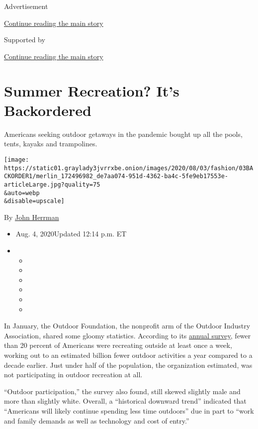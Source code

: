 Advertisement

\protect\hyperlink{after-top}{Continue reading the main story}

Supported by

\protect\hyperlink{after-sponsor}{Continue reading the main story}

\hypertarget{summer-recreation-its-backordered}{%
\section{Summer Recreation? It's
Backordered}\label{summer-recreation-its-backordered}}

Americans seeking outdoor getaways in the pandemic bought up all the
pools, tents, kayaks and trampolines.

\texttt{[image: https://static01.graylady3jvrrxbe.onion/images/2020/08/03/fashion/03BACKORDER1/merlin\_172496982\_de7aa074-951d-4362-ba4c-5fe9eb17553e-articleLarge.jpg?quality=75\\\&auto=webp\\\&disable=upscale]}

By \href{https://www.nytimes3xbfgragh.onion/by/john-herrman}{John
Herrman}

\begin{itemize}
\item
  Aug. 4, 2020Updated 12:14 p.m. ET
\item
  \begin{itemize}
  \item
  \item
  \item
  \item
  \item
  \item
  \end{itemize}
\end{itemize}

In January, the Outdoor Foundation, the nonprofit arm of the Outdoor
Industry Association, shared some gloomy statistics. According to its
\href{https://outdoorindustry.org/resource/2019-outdoor-participation-report/}{annual
survey}, fewer than 20 percent of Americans were recreating outside at
least once a week, working out to an estimated billion fewer outdoor
activities a year compared to a decade earlier. Just under half of the
population, the organization estimated, was not participating in outdoor
recreation at all.

``Outdoor participation,'' the survey also found, still skewed slightly
male and more than slightly white. Overall, a ``historical downward
trend'' indicated that ``Americans will likely continue spending less
time outdoors'' due in part to ``work and family demands as well as
technology and cost of entry.''

